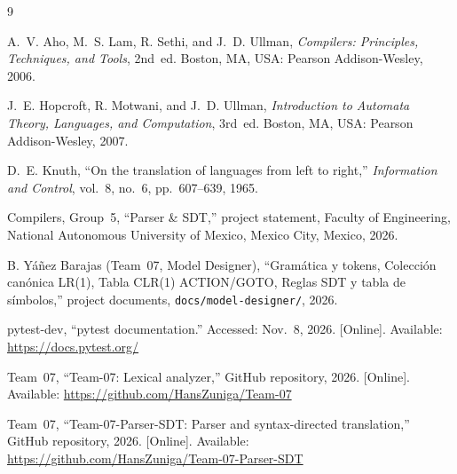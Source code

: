 \documentclass[11pt,letterpaper]{article}
\begin{document}
\newpage
\begin{thebibliography}{9}

A.~V. Aho, M.~S. Lam, R. Sethi, and J.~D. Ullman, \emph{Compilers:
Principles, Techniques, and Tools}, 2nd~ed. Boston, MA, USA: Pearson
Addison-Wesley, 2006.

J.~E. Hopcroft, R. Motwani, and J.~D. Ullman, \emph{Introduction to Automata
Theory, Languages, and Computation}, 3rd~ed. Boston, MA, USA: Pearson
Addison-Wesley, 2007.

D.~E. Knuth, ``On the translation of languages from left to right,''
\emph{Information and Control}, vol.~8, no.~6, pp.~607--639, 1965.

Compilers, Group~5, ``Parser \& SDT,'' project statement, Faculty of
Engineering, National Autonomous University of Mexico, Mexico City, Mexico,
2026.

B. Y\'a\~nez Barajas (Team~07, Model Designer), ``Gram\'atica y tokens,
Colecci\'on can\'onica LR(1), Tabla CLR(1) ACTION/GOTO, Reglas SDT y tabla de
s\'imbolos,'' project documents, \texttt{docs/model-designer/}, 2026.

pytest-dev, ``pytest documentation.'' Accessed: Nov.~8, 2026. [Online].
Available: \url{https://docs.pytest.org/}

Team~07, ``Team-07: Lexical analyzer,'' GitHub repository, 2026. [Online].
Available: \url{https://github.com/HansZuniga/Team-07}

Team~07, ``Team-07-Parser-SDT: Parser and syntax-directed translation,''
GitHub repository, 2026. [Online]. Available:
\url{https://github.com/HansZuniga/Team-07-Parser-SDT}

\end{thebibliography}
\end{document}
